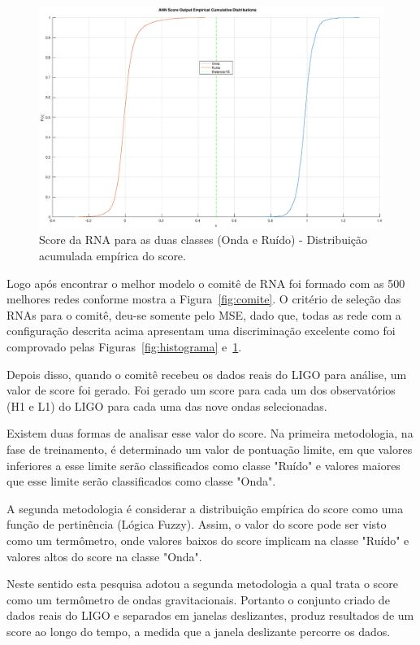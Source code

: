 \begin{figure}[H]
\centering
\includegraphics[width=1\textwidth]{figuras/KS.eps}
\caption{Score da RNA para as duas classes (Onda e Ruído) - Distribuição acumulada empírica do score.}
\label{fig:KS}
\end{figure}

Logo após encontrar o melhor modelo o comitê de RNA foi formado com as 500 melhores redes conforme mostra a Figura~\ref{fig:comite}. O critério de seleção das RNAs para o comitê, deu-se somente pelo MSE, dado que, todas as rede com a configuração descrita acima apresentam uma discriminação excelente como foi comprovado pelas Figuras~\ref{fig:histograma} e~\ref{fig:KS}.

Depois disso, quando o comitê recebeu os dados reais do LIGO para análise, um valor de score foi gerado. Foi gerado um score para cada um dos observatórios (H1 e L1) do LIGO para cada uma das nove ondas selecionadas.

Existem duas formas de analisar esse valor do score. Na primeira metodologia, na fase de treinamento, é determinado um valor de pontuação limite, em que valores inferiores a esse limite serão classificados como classe "Ruído" e valores maiores que esse limite serão classificados como classe "Onda". 

A segunda metodologia é considerar a distribuição empírica do score como uma função de pertinência (Lógica Fuzzy). Assim, o valor do score pode ser visto como um termômetro, onde valores baixos do score implicam na classe "Ruído" e valores altos do score na classe "Onda".

Neste sentido esta pesquisa adotou a segunda metodologia a qual trata o score como um termômetro de ondas gravitacionais. Portanto o conjunto criado de dados reais do LIGO e separados em janelas deslizantes, produz resultados de um score ao longo do tempo, a medida que a janela deslizante percorre os dados.

